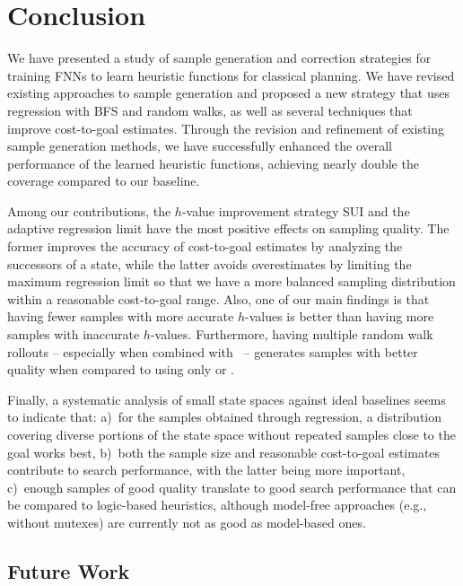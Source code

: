 \chapter{Conclusion}
\label{sec:conclusion}

We have presented a study of sample generation and correction strategies for training FNNs to learn heuristic functions for classical planning. We have revised existing approaches to sample generation and proposed a new strategy that uses regression with BFS and random walks, as well as several techniques that improve cost-to-goal estimates. Through the revision and refinement of existing sample generation methods, we have successfully enhanced the overall performance of the learned heuristic functions, achieving nearly double the coverage compared to our baseline.


Among our contributions, the $h$-value improvement strategy SUI and the adaptive regression limit \meanfx have the most positive effects on sampling quality. The former improves the accuracy of cost-to-goal estimates by analyzing the successors of a state, while the latter avoids overestimates by limiting the maximum regression limit so that we have a more balanced sampling distribution within a reasonable cost-to-goal range. Also, one of our main findings is that having fewer samples with more accurate $h$-values is better than having more samples with inaccurate $h$-values. Furthermore, having multiple random walk rollouts -- especially when combined with \bfs~-- generates samples with better quality when compared to using only \bfs or \dfs.

Finally, a systematic analysis of small state spaces against ideal baselines seems to indicate that: a)~for the samples obtained through regression, a distribution covering diverse portions of the state space without repeated samples close to the goal works best, b)~both the sample size and reasonable cost-to-goal estimates contribute to search performance, with the latter being more important, c)~enough samples of good quality translate to good search performance that can be compared to logic-based heuristics, although model-free approaches (e.g., without mutexes) are currently not as good as model-based ones.

\section{Future Work}

